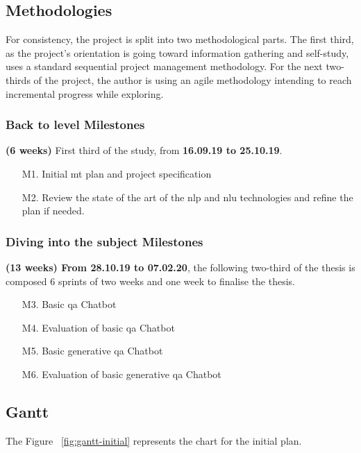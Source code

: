 \subsection{Methodologies}
For consistency, the project is split into two methodological parts. The first third, as the project's orientation is going toward information gathering and self-study, uses a standard sequential project management methodology. For the next two-thirds of the project, the author is using an agile methodology intending to reach incremental progress while exploring.

\subsubsection{Back to level Milestones}
\textbf{(6 weeks)} First third of the study, from \textbf{16.09.19 to 25.10.19}.
\begin{enumerate}
    \setlength\itemsep{0em}
    \item[M1.] Initial \gls{mt} plan and project specification
    \item[M2.] Review the state of the art of the \gls{nlp} and \gls{nlu} technologies and refine the plan if needed.
\end{enumerate}


\subsubsection{Diving into the subject Milestones}
\textbf{(13 weeks) From 28.10.19 to 07.02.20}, the following two-third of the thesis is composed 6 sprints of two weeks and one week to finalise the thesis.
\begin{itemize}
    \setlength\itemsep{0em}
    \item[M3.] Basic \gls{qa} Chatbot
    \item[M4.] Evaluation of basic \gls{qa} Chatbot
    \item[M5.] Basic generative \gls{qa} Chatbot
    \item[M6.] Evaluation of basic generative \gls{qa} Chatbot
\end{itemize}

\subsection{Gantt}
The Figure ~\ref{fig:gantt-initial} represents the chart for the initial plan.


